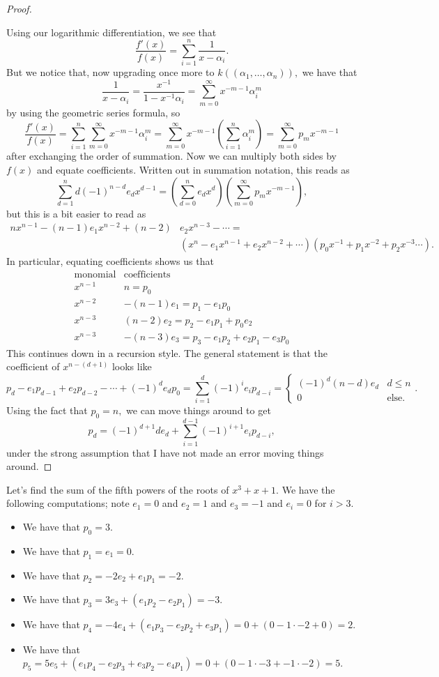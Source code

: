 \begin{proof}
\begin{remark}
	\end{remark}
	Using our logarithmic differentiation, we see that
	\[\frac{f'(x)}{f(x)}=\sum_{i=1}^n\frac1{x-\alpha_i}.\]
	But we notice that, now upgrading once more to $k((\alpha_1,\ldots,\alpha_n)),$ we have that
	\[\frac1{x-\alpha_i}=\frac{x^{-1}}{1-x^{-1}\alpha_i}=\sum_{m=0}^\infty x^{-m-1}\alpha_i^m\]
	by using the geometric series formula, so
	\[\frac{f'(x)}{f(x)}=\sum_{i=1}^n\sum_{m=0}^\infty x^{-m-1}\alpha_i^m=\sum_{m=0}^\infty x^{-m-1}\left(\sum_{i=1}^n\alpha_i^m\right)=\sum_{m=0}^\infty p_mx^{-m-1}\]
	after exchanging the order of summation. Now we can multiply both sides by $f(x)$ and equate coefficients. Written out in summation notation, this reads as
	\[\sum_{d=1}^nd(-1)^{n-d}e_dx^{d-1}=\left(\sum_{d=0}^ne_dx^d\right)\left(\sum_{m=0}^\infty p_mx^{-m-1}\right),\]
	but this is a bit easier to read as
	\begin{align*}
		nx^{n-1}-(n-1)e_1x^{n-2}+(n-2)&e_2x^{n-3}-\cdots= \\
		&\left(x^n-e_1x^{n-1}+e_2x^{n-2}+\cdots\right)\left(p_0x^{-1}+p_1x^{-2}+p_2x^{-3}\cdots\right).
	\end{align*}
	In particular, equating coefficients shows us that
	\[\begin{array}{c|c}
		\text{monomial} & \text{coefficients} \\\hline
		x^{n-1} & n=p_0 \\
		x^{n-2} & -(n-1)e_1=p_1-e_1p_0 \\
		x^{n-3} & (n-2)e_2=p_2-e_1p_1+p_0e_2 \\
		x^{n-3} & -(n-3)e_3=p_3-e_1p_2+e_2p_1-e_3p_0
	\end{array}\]
	This continues down in a recursion style. The general statement is that the coefficient of $x^{n-(d+1)}$ looks like
	\[p_d-e_1p_{d-1}+e_2p_{d-2}-\cdots+(-1)^de_dp_0=\sum_{i=1}^d(-1)^ie_ip_{d-i}=\begin{cases}
		(-1)^d(n-d)e_d & d\le n \\
		0 & \text{else.}
	\end{cases}.\]
	Using the fact that $p_0=n,$ we can move things around to get
	\[\boxed{p_d=(-1)^{d+1}de_d+\sum_{i=1}^{d-1}(-1)^{i+1}e_ip_{d-i}},\]
	under the strong assumption that I have not made an error moving things around.
\end{proof}
\begin{example}
	Let's find the sum of the fifth powers of the roots of $x^3+x+1.$ We have the following computations; note $e_1=0$ and $e_2=1$ and $e_3=-1$ and $e_i=0$ for $i>3.$
	\begin{itemize}
		\item We have that $p_0=3.$
		\item We have that $p_1=e_1=0.$
		\item We have that $p_2=-2e_2+e_1p_1=-2.$
		\item We have that $p_3=3e_3+(e_1p_2-e_2p_1)=-3.$
		\item We have that $p_4=-4e_4+(e_1p_3-e_2p_2+e_3p_1)=0+(0-1\cdot-2+0)=2.$
		\item We have that $p_5=5e_5+(e_1p_4-e_2p_3+e_3p_2-e_4p_1)=0+(0-1\cdot-3+-1\cdot-2)=\boxed{5}.$
	\end{itemize}
\end{example}
